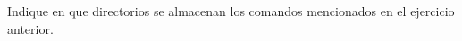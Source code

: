 \begin{questions}

\question Indique en que directorios se almacenan los comandos mencionados en el ejercicio anterior.

\end{questions}
